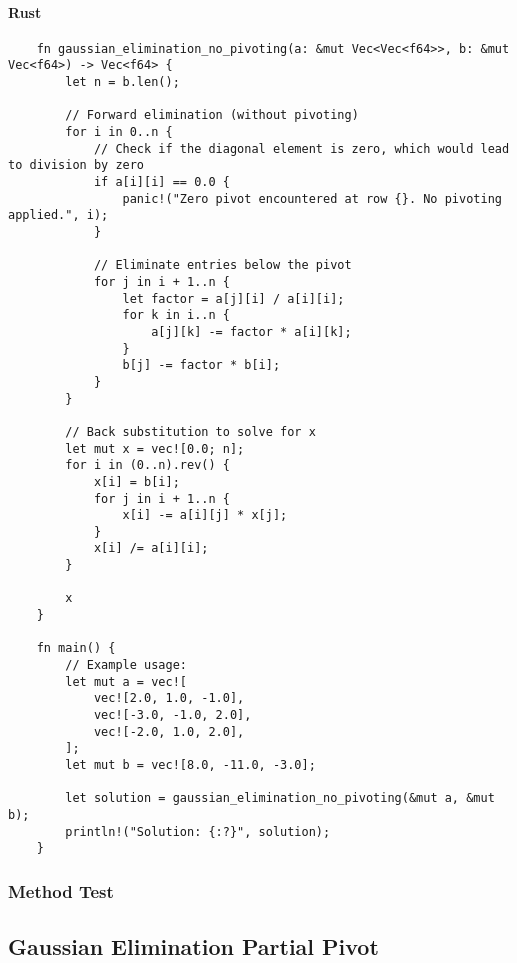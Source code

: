 \documentclass{article}
\begin{document}
            \paragraph{Rust}
                \begin{verbatim}
    fn gaussian_elimination_no_pivoting(a: &mut Vec<Vec<f64>>, b: &mut Vec<f64>) -> Vec<f64> {
        let n = b.len();

        // Forward elimination (without pivoting)
        for i in 0..n {
            // Check if the diagonal element is zero, which would lead to division by zero
            if a[i][i] == 0.0 {
                panic!("Zero pivot encountered at row {}. No pivoting applied.", i);
            }

            // Eliminate entries below the pivot
            for j in i + 1..n {
                let factor = a[j][i] / a[i][i];
                for k in i..n {
                    a[j][k] -= factor * a[i][k];
                }
                b[j] -= factor * b[i];
            }
        }

        // Back substitution to solve for x
        let mut x = vec![0.0; n];
        for i in (0..n).rev() {
            x[i] = b[i];
            for j in i + 1..n {
                x[i] -= a[i][j] * x[j];
            }
            x[i] /= a[i][i];
        }

        x
    }

    fn main() {
        // Example usage:
        let mut a = vec![
            vec![2.0, 1.0, -1.0],
            vec![-3.0, -1.0, 2.0],
            vec![-2.0, 1.0, 2.0],
        ];
        let mut b = vec![8.0, -11.0, -3.0];

        let solution = gaussian_elimination_no_pivoting(&mut a, &mut b);
        println!("Solution: {:?}", solution);
    }

                \end{verbatim}
        \subsubsection{Method Test}

    \subsection{Gaussian Elimination Partial Pivot}
\end{document}
